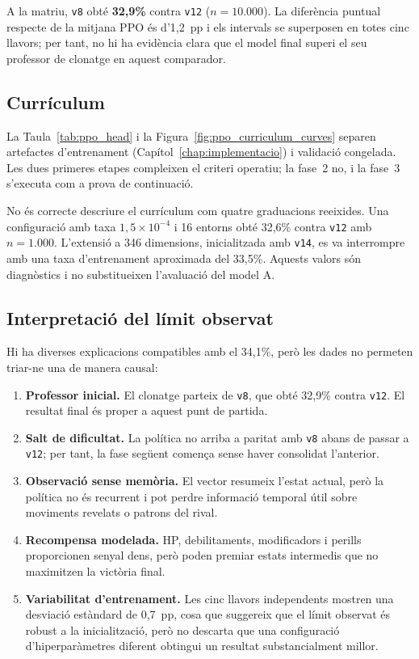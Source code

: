 A la matriu, \texttt{v8} obté \textbf{32,9\%} contra \texttt{v12} ($n=10.000$). La diferència puntual respecte de la mitjana PPO és d'1,2~pp i els intervals se superposen en totes cinc llavors; per tant, no hi ha evidència clara que el model final superi el seu professor de clonatge en aquest comparador.

\subsection{Currículum}

La Taula~\ref{tab:ppo_head} i la Figura~\ref{fig:ppo_curriculum_curves} separen artefactes d'entrenament (Capítol~\ref{chap:implementacio}) i validació congelada. Les dues primeres etapes compleixen el criteri operatiu; la fase~2 no, i la fase~3 s'executa com a prova de continuació.

No és correcte descriure el currículum com quatre graduacions reeixides. Una configuració amb taxa $1{,}5\times 10^{-4}$ i 16 entorns obté 32,6\% contra \texttt{v12} amb $n=1.000$. L'extensió a 346 dimensions, inicialitzada amb \texttt{v14}, es va interrompre amb una taxa d'entrenament aproximada del 33,5\%. Aquests valors són diagnòstics i no substitueixen l'avaluació del model A.

\subsection{Interpretació del límit observat}

Hi ha diverses explicacions compatibles amb el 34,1\%, però les dades no permeten triar-ne una de manera causal:

\begin{enumerate}
    \item \textbf{Professor inicial.} El clonatge parteix de \texttt{v8}, que obté 32,9\% contra \texttt{v12}. El resultat final és proper a aquest punt de partida.
    \item \textbf{Salt de dificultat.} La política no arriba a paritat amb \texttt{v8} abans de passar a \texttt{v12}; per tant, la fase següent comença sense haver consolidat l'anterior.
    \item \textbf{Observació sense memòria.} El vector resumeix l'estat actual, però la política no és recurrent i pot perdre informació temporal útil sobre moviments revelats o patrons del rival.
    \item \textbf{Recompensa modelada.} HP, debilitaments, modificadors i perills proporcionen senyal dens, però poden premiar estats intermedis que no maximitzen la victòria final.
    \item \textbf{Variabilitat d'entrenament.} Les cinc llavors independents mostren una desviació estàndard de 0,7~pp, cosa que suggereix que el límit observat és robust a la inicialització, però no descarta que una configuració d'hiperparàmetres diferent obtingui un resultat substancialment millor.
\end{enumerate}


